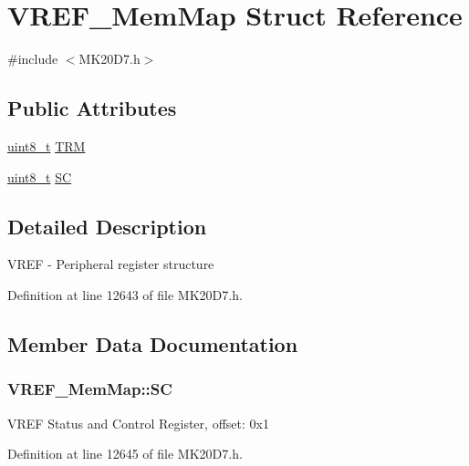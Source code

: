 \hypertarget{struct_v_r_e_f___mem_map}{}\section{V\+R\+E\+F\+\_\+\+Mem\+Map Struct Reference}
\label{struct_v_r_e_f___mem_map}


{\ttfamily \#include $<$M\+K20\+D7.\+h$>$}

\subsection*{Public Attributes}
\begin{DoxyCompactItemize}
\item 
\hyperlink{_p_e___types_8h_aba7bc1797add20fe3efdf37ced1182c5}{uint8\+\_\+t} \hyperlink{struct_v_r_e_f___mem_map_a987ecd280eb0b25ff58841b304de2e1f}{T\+RM}
\item 
\hyperlink{_p_e___types_8h_aba7bc1797add20fe3efdf37ced1182c5}{uint8\+\_\+t} \hyperlink{struct_v_r_e_f___mem_map_a5d8e7e9026a69a14ff0d0b3caee5cf24}{SC}
\end{DoxyCompactItemize}


\subsection{Detailed Description}
V\+R\+EF -\/ Peripheral register structure 

Definition at line 12643 of file M\+K20\+D7.\+h.



\subsection{Member Data Documentation}
\subsubsection[{\texorpdfstring{SC}{SC}}]{ V\+R\+E\+F\+\_\+\+Mem\+Map\+::\+SC}\hypertarget{struct_v_r_e_f___mem_map_a5d8e7e9026a69a14ff0d0b3caee5cf24}{}\label{struct_v_r_e_f___mem_map_a5d8e7e9026a69a14ff0d0b3caee5cf24}
V\+R\+EF Status and Control Register, offset\+: 0x1 

Definition at line 12645 of file M\+K20\+D7.\+h.

